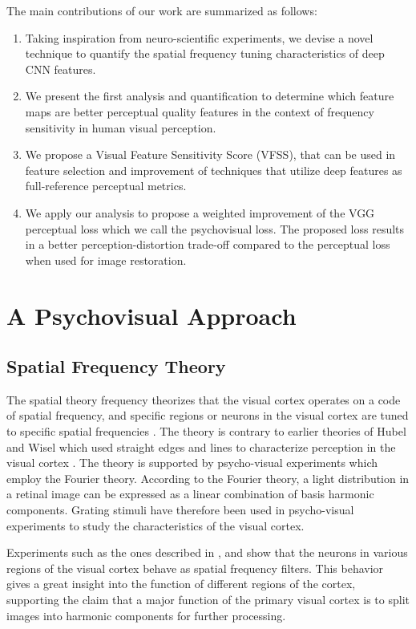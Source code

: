 \documentclass[10pt,twocolumn,letterpaper]{article}
\begin{document}
The main contributions of our work are summarized as follows:
\begin{enumerate}
\item Taking inspiration from neuro-scientific experiments, we devise a novel technique to quantify the spatial frequency tuning characteristics of deep CNN features.
\item We present the first analysis and quantification to determine which feature maps are better perceptual quality features in the context of frequency sensitivity in human visual perception.
\item We propose a Visual Feature Sensitivity Score (VFSS), that can be used in feature selection and improvement of techniques that utilize deep features as full-reference perceptual metrics.
\item We apply our analysis to propose a weighted improvement of the VGG perceptual loss which we call the psychovisual loss. The proposed loss results in a better perception-distortion trade-off compared to the perceptual loss when used for image restoration.
\end{enumerate}
\section{A Psychovisual Approach}

\subsection{Spatial Frequency Theory}
The spatial theory frequency theorizes that the visual cortex operates on a code of spatial frequency, and specific regions or neurons in the visual cortex are tuned to specific spatial frequencies \cite{14}. The theory is contrary to earlier theories of Hubel and Wisel which used straight edges and lines to characterize perception in the visual cortex \cite{18}. The theory is supported by psycho-visual experiments which employ the Fourier theory. According to the Fourier theory, a light distribution in a retinal image can be expressed as a linear combination of basis harmonic components. Grating stimuli have therefore been used in psycho-visual experiments to study the characteristics of the visual cortex.

   Experiments such as the ones described in \cite{14}, \cite{17} and \cite{19} show that the neurons in various regions of the visual cortex behave as spatial frequency filters. This behavior gives a great insight into the function of different regions of the cortex, supporting the claim that a major function of the primary visual cortex is to split images into harmonic components for further processing.
\end{document}
